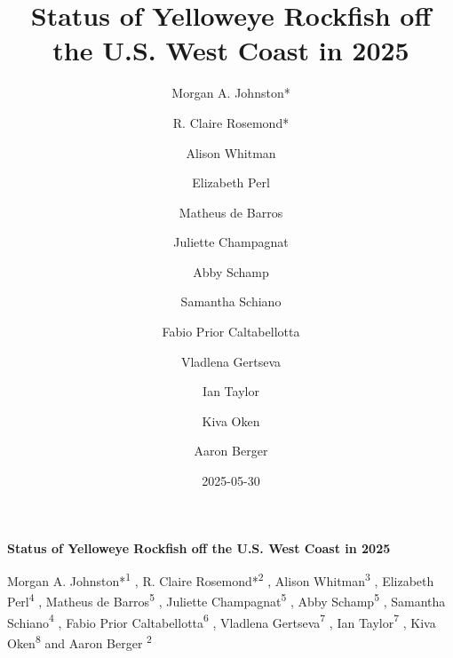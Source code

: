 \documentclass[
]{scrartcl}
\title{Status of Yelloweye Rockfish off the U.S. West Coast in 2025}
\author{Morgan A. Johnston* \and R. Claire Rosemond* \and Alison
Whitman \and Elizabeth Perl \and Matheus de Barros \and Juliette
Champagnat \and Abby Schamp \and Samantha Schiano \and Fabio Prior
Caltabellotta \and Vladlena Gertseva \and Ian Taylor \and Kiva
Oken \and Aaron Berger}
\date{2025-05-30}
\begin{document}
  \begin{titlepage}

  \begin{minipage}[b][\textheight][s]{\textwidth}


  \raggedright




  {\huge\bfseries\nohyphens{Status of Yelloweye Rockfish off the U.S.
  West Coast in 2025}}\\[1\baselineskip]



  \vspace{1\baselineskip}


  \vspace{1\baselineskip}

   {\large{Morgan A. Johnston*}}{\textsuperscript{1}}%
  ,
   {\large{R. Claire Rosemond*}}{\textsuperscript{2}}%
  ,
   {\large{Alison Whitman}}{\textsuperscript{3}}%
  ,
   {\large{Elizabeth Perl}}{\textsuperscript{4}}%
  ,
   {\large{Matheus de Barros}}{\textsuperscript{5}}%
  ,
   {\large{Juliette Champagnat}}{\textsuperscript{5}}%
  ,
   {\large{Abby Schamp}}{\textsuperscript{5}}%
  ,
   {\large{Samantha Schiano}}{\textsuperscript{4}}%
  ,
   {\large{Fabio Prior Caltabellotta}}{\textsuperscript{6}}%
  ,
   {\large{Vladlena Gertseva}}{\textsuperscript{7}}%
  ,
   {\large{Ian Taylor}}{\textsuperscript{7}}%
  ,
   {\large{Kiva Oken}}{\textsuperscript{8}}%
  { and \large{Aaron Berger}}%
  {\textsuperscript{2}}%



\end{minipage}
\end{titlepage}
\end{document}

